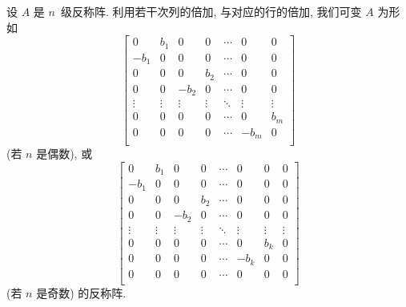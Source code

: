 \documentclass[../libro.tex]{subfiles}
\begin{document}
\begin{theorem}
    设 \(A\) 是 \(n\)~级反称阵.
    利用若干次列的倍加, 与对应的行的倍加,
    我们可变 \(A\) 为形如
    \begin{equation}
        \begin{bmatrix}
            0      & b_1    & 0      & 0      & \cdots & 0      & 0      \\
            -b_1   & 0      & 0      & 0      & \cdots & 0      & 0      \\
            0      & 0      & 0      & b_2    & \cdots & 0      & 0      \\
            0      & 0      & -b_2   & 0      & \cdots & 0      & 0      \\
            \vdots & \vdots & \vdots & \vdots & \ddots & \vdots & \vdots \\
            0      & 0      & 0      & 0      & \cdots & 0      & b_m    \\
            0      & 0      & 0      & 0      & \cdots & -b_m   & 0      \\
        \end{bmatrix}
        \label{eq:C3201}
    \end{equation}
    (若 \(n\) 是偶数), 或
    \begin{equation}
        \begin{bmatrix}
            0      & b_1    & 0      & 0      & \cdots & 0      & 0      & 0      \\
            -b_1   & 0      & 0      & 0      & \cdots & 0      & 0      & 0      \\
            0      & 0      & 0      & b_2    & \cdots & 0      & 0      & 0      \\
            0      & 0      & -b_2   & 0      & \cdots & 0      & 0      & 0      \\
            \vdots & \vdots & \vdots & \vdots & \ddots & \vdots & \vdots & \vdots \\
            0      & 0      & 0      & 0      & \cdots & 0      & b_k    & 0      \\
            0      & 0      & 0      & 0      & \cdots & -b_k   & 0      & 0      \\
            0      & 0      & 0      & 0      & \cdots & 0      & 0      & 0      \\
        \end{bmatrix}
        \label{eq:C3202}
    \end{equation}
    (若 \(n\) 是奇数) 的反称阵.


\end{theorem}
\end{document}
